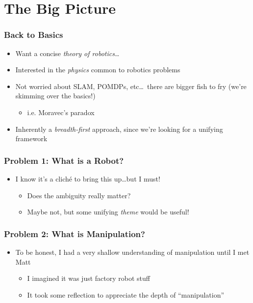 \documentclass[aspectratio=169]{beamer}
\begin{document}
	\section{The Big Picture}
		\begin{frame}
			\frametitle{Back to Basics}
			\begin{itemize}[<+->]
				\item Want a concise \emph{theory of robotics}\dots
				\item Interested in the \emph{physics} common to robotics problems
				\item Not worried about SLAM, POMDPs, etc\dots~there are bigger fish to fry (we're skimming over the basics!)
					\begin{itemize}
						\item i.e. Moravec's paradox \autocite{moravec1988mind}
					\end{itemize}
				\item Inherently a \emph{breadth-first} approach, since we're looking for a unifying framework
			\end{itemize}
		\end{frame}
	
		\begin{frame}
			\frametitle{Problem 1: What is a Robot?}
			\begin{itemize}
				\item I know it's a cliché to bring this up\dots \pause but I must! \pause
				\begin{itemize}
					\item Does the ambiguity really matter? \pause
					\item Maybe not, but some unifying \emph{theme} would be useful!
				\end{itemize}
			\end{itemize}
		\end{frame}
	
		\begin{frame}
			\frametitle{Problem 2: What is Manipulation?}
			\begin{itemize}
				\item To be honest, I had a very shallow understanding of manipulation until I met Matt \pause
					\begin{itemize}
						\item I imagined it was just factory robot stuff \pause
						\item It took some reflection to appreciate the depth of ``manipulation''
					\end{itemize}
			\end{itemize}
		\end{frame}
	
\end{document}
